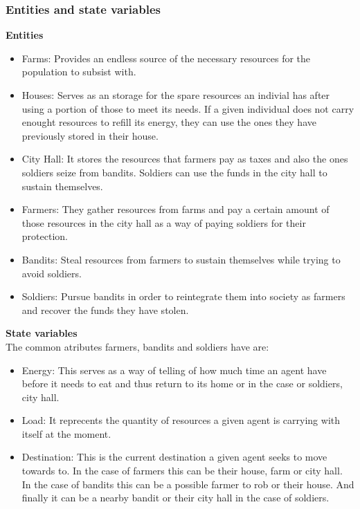 \documentclass{wscpaperproc}
\theoremstyle{wsc}
\begin{document}
\subsubsection{Entities and state variables}
\noindent \textbf{Entities}

\begin{itemize}
    \item Farms: Provides an endless source of the necessary resources for the population to
          subsist with.
    \item Houses: Serves as an storage for the spare resources an indivial has after using a portion
          of those to meet its needs. If a given individual does not carry enought resources
          to refill its energy, they can use the ones they have previously stored in their house.
    \item City Hall: It stores the resources that farmers pay as taxes and also the ones soldiers
          seize from bandits. Soldiers can use the funds in the city hall to sustain themselves.
    \item Farmers: They gather resources from farms and pay a certain amount of those resources in the
          city hall as a way of paying soldiers for their protection.
    \item Bandits: Steal resources from farmers to sustain themselves while trying to avoid soldiers.
    \item Soldiers: Pursue bandits in order to reintegrate them into society as farmers and recover
          the funds they have stolen.
\end{itemize}

\noindent \textbf{State variables}\\

\noindent The common atributes farmers, bandits and soldiers have are:

\begin{itemize}
    \item Energy: This serves as a way of telling of how much time an agent have before it needs to
          eat and thus return to its home or in the case or soldiers, city hall.
    \item Load: It reprecents the quantity of resources a given agent is carrying with itself at the
          moment.
    \item Destination: This is the current destination a given agent seeks to move towards to. In the
          case of farmers this can be their house, farm or city hall. In the case of bandits this can
          be a possible farmer to rob or their house. And finally it can be a nearby bandit or their
          city hall in the case of soldiers.
\end{itemize}
\end{document}
